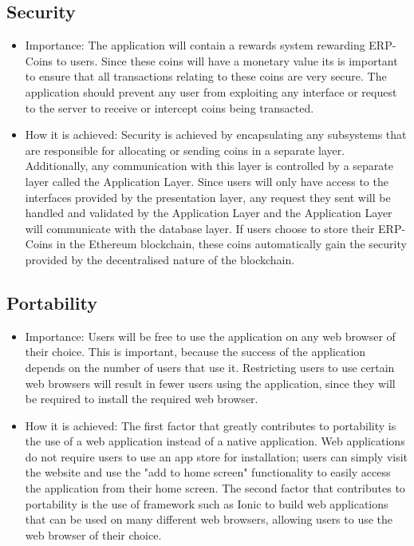 \documentclass{article}
\begin{document}
\subsection{Security}
\begin{itemize}
\item Importance: The application will contain a rewards system rewarding ERP-Coins to users. Since these coins will have a monetary value its is important to ensure that all transactions relating to these coins are very secure. The application should prevent any user from exploiting any interface or request to the server to receive or intercept coins being transacted.
\item How it is achieved: Security is achieved by encapsulating any subsystems that are responsible for allocating or sending coins in a separate layer. Additionally, any communication with this layer is controlled by a separate layer called the Application Layer. Since users will only have access to the interfaces provided by the presentation layer, any request they sent will be handled and validated by the Application Layer and the Application Layer will communicate with the database layer. If users choose to store their ERP-Coins in the Ethereum blockchain, these coins automatically gain the security provided by the decentralised nature of the blockchain.
\end{itemize}

\subsection{Portability}
\begin{itemize}
\item Importance: Users will be free to use the application on any web browser of their choice. This is important, because the success of the application depends on the number of users that use it. Restricting users to use certain web browsers will result in fewer users using the application, since they will be required to install the required web browser. 
\item How it is achieved: The first factor that greatly contributes to portability is the use of a web application instead of a native application. Web applications do not require users to use an app store for installation; users can simply visit the website and use the "add to home screen" functionality to easily access the application from their home screen. The second factor that contributes to portability is the use of framework such as Ionic to build web applications that can be used on many different web browsers, allowing users to use the web browser of their choice.
\end{itemize}
\newpage
\end{document}
